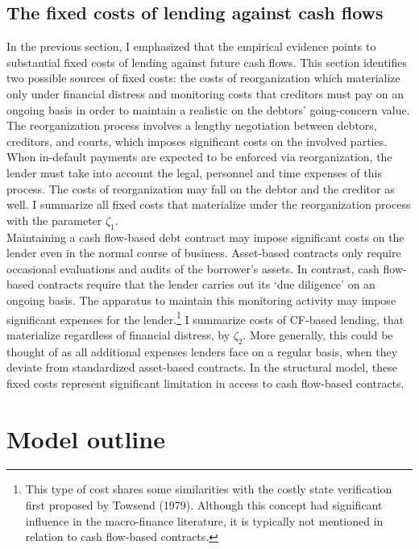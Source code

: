 \documentclass[12pt]{article}
\begin{document}
\subsection{The fixed costs of lending against cash flows \label{sec:fixed costs}}
In the previous section, I emphasized that the empirical evidence points to substantial fixed costs of lending against future cash flows. This section identifies two possible sources of fixed costs: the costs of reorganization which materialize only under financial distress and monitoring costs that creditors must pay on an ongoing basis in order to maintain a realistic on the debtors' going-concern value. \vspace{3mm} \\
The reorganization process involves a lengthy negotiation between debtors, creditors, and courts, which imposes significant costs on the involved parties. When in-default payments are expected to be enforced via reorganization, the lender must take into account the legal, personnel and time expenses of this process. The costs of reorganization may fall on the debtor and the creditor as well. I summarize all fixed costs that materialize under the reorganization process with the parameter $\zeta_1$. \vspace{3mm} \\
Maintaining a cash flow-based debt contract may impose significant costs on the lender even in the normal course of business. Asset-based contracts only require occasional evaluations and audits of the borrower's assets. In contrast, cash flow-based contracts require that the lender carries out its `due diligence' on an ongoing basis. The apparatus to maintain this monitoring activity may impose significant expenses for the lender.\footnote{This type of cost shares some similarities with the costly state verification first proposed by Towsend (1979). Although this concept had significant influence in the macro-finance literature, it is typically not mentioned in relation to cash flow-based contracts.} I summarize costs of CF-based lending, that materialize regardless of financial distress, by $\zeta_2$. More generally, this could be thought of as all additional expenses lenders face on a regular basis, when they deviate from standardized asset-based contracts. In the structural model, these fixed costs represent significant limitation in access to cash flow-based contracts. 

\section{Model outline \label{sec:model}}
\end{document}
